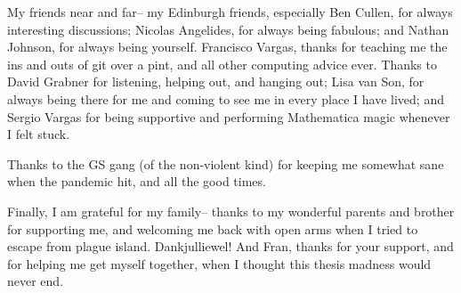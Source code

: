 My friends near and far-- my Edinburgh friends, especially Ben Cullen, for always interesting discussions; Nicolas Angelides, for always being fabulous; and Nathan Johnson, for always being yourself. Francisco Vargas, thanks for teaching me the ins and outs of git over a pint, and all other computing advice ever. Thanks to David Grabner for listening, helping out, and hanging out; Lisa van Son, for always being there for me and coming to see me in every place I have lived; and Sergio Vargas for being supportive and performing Mathematica magic whenever I felt stuck.

Thanks to the GS gang (of the non-violent kind) for keeping me somewhat sane when the pandemic hit, and all the good times.

Finally, I am grateful for my family-- thanks to my wonderful parents and brother for supporting me, and welcoming me back with open arms when I tried to escape from plague island. Dankjulliewel! 
And Fran, thanks for your support, and for helping me get myself together, when I thought this thesis madness would never end. 



